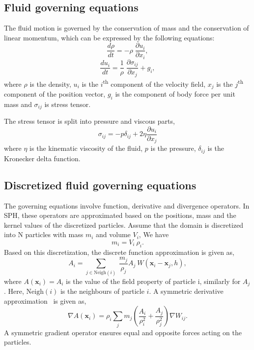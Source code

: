 \documentclass[preprint,12pt]{elsarticle}
\newcommand{\ten}[1]{\ensuremath{\mathbf{#1}}}
\begin{document}
\FloatBarrier%
\subsection{Fluid governing equations}
\label{sec:fluid--governing-equations}
The fluid motion is governed by the conservation of mass and the conservation
of linear momentum, which can be expressed by the following equations:
\begin{equation}
  \label{eq:ce}
  \frac{d \rho}{d t} = - \rho \; \frac{\partial u_i}{\partial x_i},
\end{equation}
\begin{equation}
  \label{eq:me}
  \frac{d u_i}{d t} = \frac{1}{\rho} \; \frac{\partial \sigma_{ij}}{\partial x_j}
  + g_i,
\end{equation}
where $\rho$ is the density, $u_i$ is the $i$\textsuperscript{th} component of
the velocity field, $x_j$ is the $j$\textsuperscript{th} component of the
position vector, $g_i$ is the component of body force per unit mass and
$\sigma_{ij}$ is stress tensor.

The stress tensor is split into pressure and viscous parts,
\begin{equation}
  \label{eq:fluid-stress-decomposition}
  \sigma_{ij} = - p \delta_{ij} + 2 \eta \frac{\partial u_i}{\partial x_j}
\end{equation}
where $\eta$ is the kinematic viscosity of the fluid, $p$ is the pressure,
$\delta_{ij}$ is the Kronecker delta function.


\FloatBarrier%
\subsection{Discretized fluid governing equations}
\label{sec:sph--governing-equations}
The governing equations involve function, derivative and divergence
operators. In SPH, these operators are approximated based on the positions,
mass and the kernel values of the discretized particles. Assume that the
domain is discretized into N particles with mass $m_i$ and volume
$V_i$, We have
\begin{equation}
  \label{eq:mass_repr}
  m_i = V_i \> \rho_i.
\end{equation}
Based on this discretization, the discrete function approximation is given as,
\begin{equation}
  \label{eq:discrete_form}
  A_i = \sum_{j \in \text{Neigh}(i)}\> \frac{m_j}{\rho_j} A_j\> W(\ten{x}_i - \ten{x}_j, h),
\end{equation}
where $A(\boldsymbol{x}_i) = A_i$ is the value of the field property of
particle i, similarly for $A_j$. Here, $\text{Neigh}(i)$ is the neighbours of
particle $i$.  A symmetric derivative approximation~\cite{Violeau16} is given
as,
\begin{equation}
  \nabla A(\ten{x}_i) = \rho_i \sum_{j} m_j \left(\frac{A_i}{\rho_i^2} + \frac{A_j}{\rho_j^2}\right) \nabla W_{ij}.
\end{equation}
A symmetric gradient operator ensures equal and opposite forces acting on the
particles.
\end{document}
